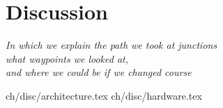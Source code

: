 \chapter{Discussion}\label{ch:disc}

\begin{flushright}{\slshape
    In which we explain the path we took at junctions\\
    what waypoints we looked at,\\
    and where we could be if we changed course
}
\end{flushright}

 {ch/disc/architecture.tex}
 {ch/disc/hardware.tex}


